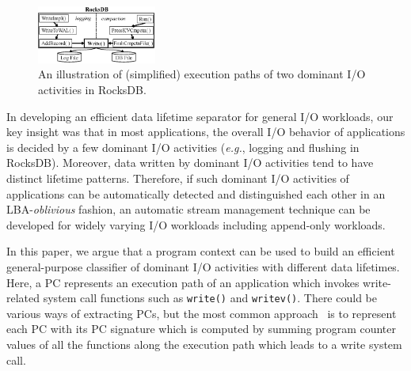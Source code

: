 \vspace{-10pt}
\section{}
\label{sec:programcontext}
\vspace{-5pt}
\begin{figure}[t]
	\centering
	\includegraphics[width=0.35\textwidth]{figure/writepath}
	\vspace{-10pt}
	\caption{An illustration of (simplified) execution paths of two dominant I/O activities in RocksDB.}
	\label{fig:iopath}
	\vspace{-20pt}
\end{figure}

In developing an efficient data lifetime separator for general I/O workloads,
our key insight was that in most applications, the overall I/O behavior of
applications is decided by a few dominant I/O activities ({\it e.g.}, logging and
flushing in RocksDB).  Moreover, data written by dominant I/O activities tend
to have distinct lifetime patterns.  Therefore, if such dominant I/O activities
of applications can be automatically detected and distinguished each other in
an LBA-{\it oblivious} fashion, an automatic stream management technique can be
developed for widely varying I/O workloads including append-only workloads.

In this paper, we argue that a program context can be used to build an
efficient general-purpose classifier of dominant I/O activities with different
data lifetimes.  Here, a PC represents an execution path of an application
which invokes write-related system call functions such as {\tt write()} and
{\tt writev()}.  There could be various ways of extracting PCs, but the most
common approach~\cite{PC, PC2} is to represent each PC with its PC signature
which is computed by summing program counter values of all the functions along
the execution path which leads to a write system call.

